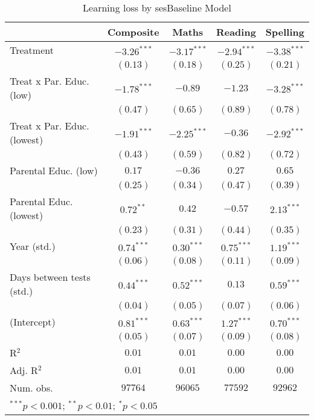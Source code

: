 
\begin{table}
\begin{center}
\begin{tabular}{l c c c c}
\hline
 & Composite & Maths & Reading & Spelling \\
\hline
Treatment                   & $-3.26^{***}$ & $-3.17^{***}$ & $-2.94^{***}$ & $-3.38^{***}$ \\
                            & $(0.13)$      & $(0.18)$      & $(0.25)$      & $(0.21)$      \\
Treat x Par. Educ. (low)    & $-1.78^{***}$ & $-0.89$       & $-1.23$       & $-3.28^{***}$ \\
                            & $(0.47)$      & $(0.65)$      & $(0.89)$      & $(0.78)$      \\
Treat x Par. Educ. (lowest) & $-1.91^{***}$ & $-2.25^{***}$ & $-0.36$       & $-2.92^{***}$ \\
                            & $(0.43)$      & $(0.59)$      & $(0.82)$      & $(0.72)$      \\
Parental Educ. (low)        & $0.17$        & $-0.36$       & $0.27$        & $0.65$        \\
                            & $(0.25)$      & $(0.34)$      & $(0.47)$      & $(0.39)$      \\
Parental Educ. (lowest)     & $0.72^{**}$   & $0.42$        & $-0.57$       & $2.13^{***}$  \\
                            & $(0.23)$      & $(0.31)$      & $(0.44)$      & $(0.35)$      \\
Year (std.)                 & $0.74^{***}$  & $0.30^{***}$  & $0.75^{***}$  & $1.19^{***}$  \\
                            & $(0.06)$      & $(0.08)$      & $(0.11)$      & $(0.09)$      \\
Days between tests (std.)   & $0.44^{***}$  & $0.52^{***}$  & $0.13$        & $0.59^{***}$  \\
                            & $(0.04)$      & $(0.05)$      & $(0.07)$      & $(0.06)$      \\
(Intercept)                 & $0.81^{***}$  & $0.63^{***}$  & $1.27^{***}$  & $0.70^{***}$  \\
                            & $(0.05)$      & $(0.07)$      & $(0.09)$      & $(0.08)$      \\
\hline
R$^2$                       & $0.01$        & $0.01$        & $0.00$        & $0.00$        \\
Adj. R$^2$                  & $0.01$        & $0.01$        & $0.00$        & $0.00$        \\
Num. obs.                   & $97764$       & $96065$       & $77592$       & $92962$       \\
\hline
\multicolumn{5}{l}{\scriptsize{$^{***}p<0.001$; $^{**}p<0.01$; $^{*}p<0.05$}}
\end{tabular}
\caption{Learning loss by sesBaseline Model}
\label{tableses}
\end{center}
\end{table}
